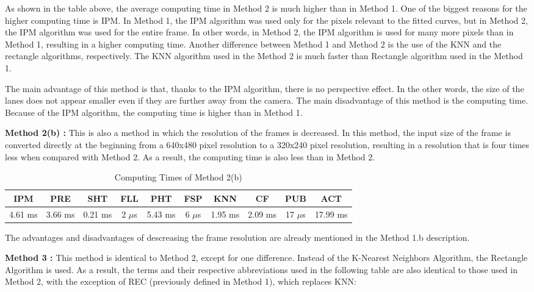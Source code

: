 As shown in the table above, the average computing time in Method 2 is much higher than in Method 1. One of the biggest reasons for the higher computing time is IPM. In Method 1, the IPM algorithm was used only for the pixels relevant to the fitted curves, but in Method 2, the IPM algorithm was used for the entire frame. In other words, in Method 2, the IPM algorithm is used for many more pixels than in Method 1, resulting in a higher computing time. Another difference between Method 1 and Method 2 is the use of the KNN and the rectangle algorithms, respectively. The KNN algorithm used in the Method 2 is much faster than Rectangle algorithm used in the Method 1.

The main advantage of this method is that, thanks to the IPM algorithm, there is no perspective
effect. In the other words, the size of the lanes does not appear smaller even if they are further away from the camera. The main disadvantage of this method is the computing time. Because of the IPM algorithm, the computing time is higher than in Method 1.



\textbf{Method 2(b) : }This is also a method in which the resolution of the frames is decreased. In this method, the input size of the frame is converted directly at the beginning from a 640x480 pixel resolution to a 320x240 pixel resolution, resulting in a resolution that is four times less when compared with Method 2. As a result, the computing time is also less than in Method 2.


\begin{table}[ht]
\caption{Computing Times of Method 2(b)} 
\centering 
  \begin{tabular}{ | c | c | c | c | c | c | c | c | c | c |}
    \hline
  
  IPM 		& PRE 		& SHT	   & FLL 	   & PHT 	   & FSP 	    & KNN 	   & CF 	  & PUB 	& ACT \\ \hline  
  4.61 ms   &  3.66 ms  &  0.21 ms  &  2 $\mu$s  &  5.43 ms  &  6 $\mu$s &  1.95 ms  &  2.09 ms & 17 $\mu$s & 17.99 ms\\ \hline  
    
    
      \end{tabular}
  \label{tab:Case5_Times}
\end{table}


The advantages and disadvantages of descreasing the frame resolution are already mentioned in the Method 1.b description.




\textbf{Method 3 : }This method is identical to Method 2, except for one difference. Instead of the
K-Nearest Neighbors Algorithm, the Rectangle Algorithm is used. As a result, the terms and their respective abbreviations used in the following table are also identical to those used in Method 2, with the exception of REC (previously defined in Method 1), which replaces KNN:



